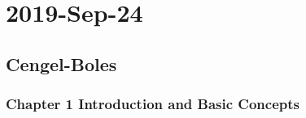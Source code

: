 \chapter{2019-Sep-24}

\section{Cengel-Boles}

\subsection{Chapter 1 Introduction and Basic Concepts}

